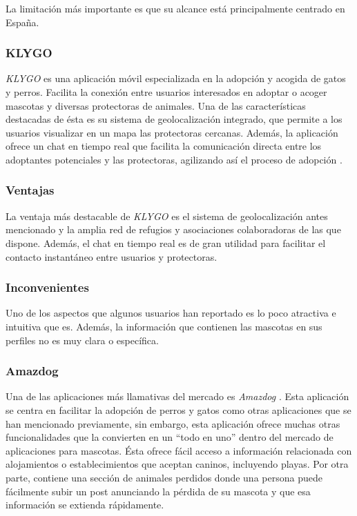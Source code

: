 \documentclass[a4paper, 12pt]{article}
\begin{document}
La limitación más importante es que su alcance está principalmente centrado en España. 

\subsubsection*{KLYGO}

\textit{KLYGO} es una aplicación móvil especializada en la adopción y acogida de gatos y perros. Facilita la conexión entre usuarios interesados en adoptar o acoger mascotas y diversas protectoras de animales. Una de las características destacadas de ésta es su sistema de geolocalización integrado, que permite a los usuarios visualizar en un mapa las protectoras cercanas. Además, la aplicación ofrece un chat en tiempo real que facilita la comunicación directa entre los adoptantes potenciales y las protectoras, agilizando así el proceso de adopción \cite{klygo}.

\subsubsection*{Ventajas}

La ventaja más destacable de \textit{KLYGO} es el sistema de geolocalización antes mencionado y la amplia red de refugios y asociaciones colaboradoras de las que dispone. Además, el chat en tiempo real es de gran utilidad para facilitar el contacto instantáneo entre usuarios y protectoras.

\subsubsection*{Inconvenientes}

Uno de los aspectos que algunos usuarios han reportado es lo poco atractiva e intuitiva que es. Además, la información que contienen las mascotas en sus perfiles no es muy clara o específica.

\subsubsection*{Amazdog}

Una de las aplicaciones más llamativas del mercado es \textit{Amazdog} \cite{amazdog}. Esta aplicación se centra en facilitar la adopción de perros y gatos como otras aplicaciones que se han mencionado previamente, sin embargo, esta aplicación ofrece muchas otras funcionalidades que la convierten en un ``todo en uno'' dentro del mercado de aplicaciones para mascotas. Ésta ofrece fácil acceso a información relacionada con alojamientos o establecimientos que aceptan caninos, incluyendo playas. Por otra parte, contiene una sección de animales perdidos donde una persona puede fácilmente subir un post anunciando la pérdida de su mascota y que esa información se extienda rápidamente.
\end{document}
